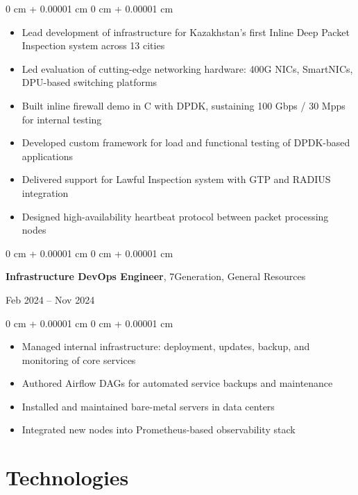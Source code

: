 \documentclass[10pt, letterpaper]{article}
\newenvironment{highlights}{
    \begin{itemize}[
        topsep=0.10 cm,
        parsep=0.10 cm,
        partopsep=0pt,
        itemsep=0pt,
        leftmargin=0 cm + 10pt
    ]
}{
    \end{itemize}
} %
\newenvironment{onecolentry}{
    \begin{adjustwidth}{
        0 cm + 0.00001 cm
    }{
        0 cm + 0.00001 cm
    }
}{
    \end{adjustwidth}
} %
\newenvironment{twocolentry}[2][]{
    \onecolentry
    \def\secondColumn{#2}
    \setcolumnwidth{\fill, 4.5 cm}
    \begin{paracol}{2}
}{
    \switchcolumn \raggedleft \secondColumn
    \end{paracol}
    \endonecolentry
} %
\begin{document}
\vspace{0.10 cm}
\begin{onecolentry}
    \begin{highlights}
        \item Lead development of infrastructure for Kazakhstan’s first Inline Deep Packet Inspection system across 13 cities
        \item Led evaluation of cutting-edge networking hardware: 400G NICs, SmartNICs, DPU-based switching platforms
        \item Built inline firewall demo in C with DPDK, sustaining 100 Gbps / 30 Mpps for internal testing
        \item Developed custom framework for load and functional testing of DPDK-based applications
        \item Delivered support for Lawful Inspection system with GTP and RADIUS integration
        \item Designed high-availability heartbeat protocol between packet processing nodes
    \end{highlights}
\end{onecolentry}

\vspace{0.2 cm}

\begin{twocolentry}{
    Feb 2024 – Nov 2024
}
    \textbf{Infrastructure DevOps Engineer}, 7Generation, General Resources
\end{twocolentry}

\vspace{0.10 cm}
\begin{onecolentry}
    \begin{highlights}
        \item Managed internal infrastructure: deployment, updates, backup, and monitoring of core services
        \item Authored Airflow DAGs for automated service backups and maintenance
        \item Installed and maintained bare-metal servers in data centers
        \item Integrated new nodes into Prometheus-based observability stack
    \end{highlights}
\end{onecolentry}

\section{Technologies}
\end{document}
